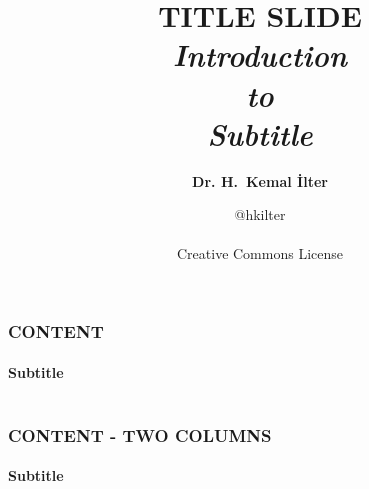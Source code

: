 \documentclass[14 pt]{beamer}
\title[Short-title]{TITLE SLIDE\\ \vskip1cm \fontspec{Crimson Text}
\textit{Introduction\\to\\Subtitle}}
\date[ilter-desc]{@hkilter\\ \vskip4cm \ccbyncnd \\ Creative Commons License}
\author[ilter]{\textbf{Dr. H.~Kemal İlter}}
\begin{document}

%
%


\begin{frame}
\titlepage
\end{frame}


\begin{frame}[t]
\frametitle{CONTENT}
\framesubtitle{Subtitle}

\begin{columns}[t]
\begin{column}{0.96\textwidth}
\lipsum[1]
\vskip0.5cm%
\lipsum[2]
\end{column}
\end{columns}
\end{frame}


\begin{frame}[t]
\frametitle{CONTENT - TWO COLUMNS}
\framesubtitle{Subtitle}
\begin{columns}[t]
\begin{column}{0.45\textwidth}
\lipsum[3]
\vskip0.5cm%
\lipsum[4]
\end{column}
\begin{column}{0.45\textwidth}
\lipsum[5]
\vskip0.5cm%
\lipsum[6]
\end{column}
\end{columns}
\end{frame}

\end{document}

